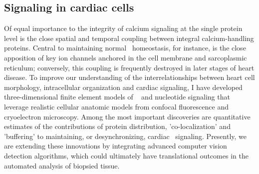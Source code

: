 \subsection*{Signaling in cardiac cells}
\begin{refsection}
Of equal importance to the integrity of calcium signaling at the single protein level is the close spatial and temporal coupling between integral calcium-handling proteins. 
Central to maintaining normal \catwo\ homeostasis, for instance, is the close apposition of key ion channels anchored in the cell membrane and sarcoplasmic reticulum; conversely, this coupling is frequently destroyed in later stages of heart disease.
To improve our understanding of the interrelationships between heart cell morphology, intracellular organization and cardiac signaling, I have developed three-dimensional finite element models of \catwo\ \autocite{Hake2012,Kekenes-Huskey2012} and nucleotide signaling \autocite{Kekenes-Huskey2013} that leverage realistic cellular anatomic models from confocal fluorescence and cryoelectron microscopy.
Among the most important discoveries are quantitative estimates of the contributions of protein distribution, 'co-localization' and 'buffering' to maintaining, or desynchronizing, cardiac \catwo\ signaling. 
Presently, we are extending these innovations by integrating advanced computer vision detection algorithms, which could ultimately have translational outcomes in the automated analysis of biopsied tissue. 

\printbibliography[heading=none] %
\end{refsection}

